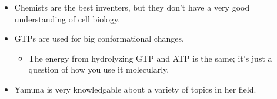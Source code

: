 \documentclass[../notes.tex]{subfiles}
\begin{document}
\begin{itemize}
\begin{itemize}
    \end{itemize}
    \item Chemists are the best inventers, but they don't have a very good understanding of cell biology.
    \item GTPs are used for big conformational changes.
    \begin{itemize}
        \item The energy from hydrolyzing GTP and ATP is the same; it's just a question of how you use it molecularly.
    \end{itemize}
    \item Yamuna is very knowledgable about a variety of topics in her field.
\end{itemize}
\end{document}
